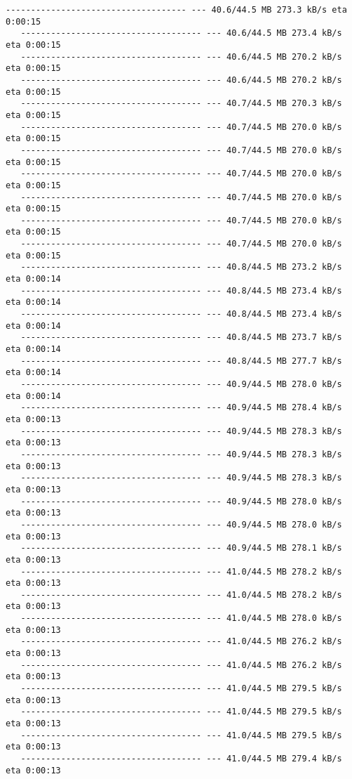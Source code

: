 \documentclass[11pt]{article}
\begin{document}
\begin{Verbatim}[commandchars=\\\{\}]
   ------------------------------------ --- 40.6/44.5 MB 273.3 kB/s eta 0:00:15
   ------------------------------------ --- 40.6/44.5 MB 273.4 kB/s eta 0:00:15
   ------------------------------------ --- 40.6/44.5 MB 270.2 kB/s eta 0:00:15
   ------------------------------------ --- 40.6/44.5 MB 270.2 kB/s eta 0:00:15
   ------------------------------------ --- 40.7/44.5 MB 270.3 kB/s eta 0:00:15
   ------------------------------------ --- 40.7/44.5 MB 270.0 kB/s eta 0:00:15
   ------------------------------------ --- 40.7/44.5 MB 270.0 kB/s eta 0:00:15
   ------------------------------------ --- 40.7/44.5 MB 270.0 kB/s eta 0:00:15
   ------------------------------------ --- 40.7/44.5 MB 270.0 kB/s eta 0:00:15
   ------------------------------------ --- 40.7/44.5 MB 270.0 kB/s eta 0:00:15
   ------------------------------------ --- 40.7/44.5 MB 270.0 kB/s eta 0:00:15
   ------------------------------------ --- 40.8/44.5 MB 273.2 kB/s eta 0:00:14
   ------------------------------------ --- 40.8/44.5 MB 273.4 kB/s eta 0:00:14
   ------------------------------------ --- 40.8/44.5 MB 273.4 kB/s eta 0:00:14
   ------------------------------------ --- 40.8/44.5 MB 273.7 kB/s eta 0:00:14
   ------------------------------------ --- 40.8/44.5 MB 277.7 kB/s eta 0:00:14
   ------------------------------------ --- 40.9/44.5 MB 278.0 kB/s eta 0:00:14
   ------------------------------------ --- 40.9/44.5 MB 278.4 kB/s eta 0:00:13
   ------------------------------------ --- 40.9/44.5 MB 278.3 kB/s eta 0:00:13
   ------------------------------------ --- 40.9/44.5 MB 278.3 kB/s eta 0:00:13
   ------------------------------------ --- 40.9/44.5 MB 278.3 kB/s eta 0:00:13
   ------------------------------------ --- 40.9/44.5 MB 278.0 kB/s eta 0:00:13
   ------------------------------------ --- 40.9/44.5 MB 278.0 kB/s eta 0:00:13
   ------------------------------------ --- 40.9/44.5 MB 278.1 kB/s eta 0:00:13
   ------------------------------------ --- 41.0/44.5 MB 278.2 kB/s eta 0:00:13
   ------------------------------------ --- 41.0/44.5 MB 278.2 kB/s eta 0:00:13
   ------------------------------------ --- 41.0/44.5 MB 278.0 kB/s eta 0:00:13
   ------------------------------------ --- 41.0/44.5 MB 276.2 kB/s eta 0:00:13
   ------------------------------------ --- 41.0/44.5 MB 276.2 kB/s eta 0:00:13
   ------------------------------------ --- 41.0/44.5 MB 279.5 kB/s eta 0:00:13
   ------------------------------------ --- 41.0/44.5 MB 279.5 kB/s eta 0:00:13
   ------------------------------------ --- 41.0/44.5 MB 279.5 kB/s eta 0:00:13
   ------------------------------------ --- 41.0/44.5 MB 279.4 kB/s eta 0:00:13

\end{Verbatim}
\end{document}
